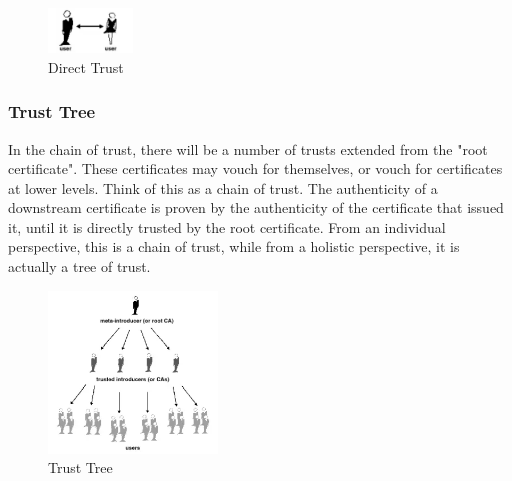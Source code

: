 \begin{figure}[H] %
    \centering %
    \includegraphics[width=0.2\textwidth]{figures/directTrust.png} %
    \caption{Direct Trust} %
    \label{Fig.3: Direct Trust} %
\end{figure}


\subsubsection{Trust Tree}
In the chain of trust, there will be a number of trusts extended from the "root 
certificate". These certificates may vouch for themselves, or vouch for certificates 
at lower levels. Think of this as a chain of trust\cite{b31}. The authenticity of a downstream 
certificate is proven by the authenticity of the certificate that issued it, until 
it is directly trusted by the root certificate. From an individual perspective, this 
is a chain of trust, while from a holistic perspective, it is actually a tree of trust\cite{b28}.

\begin{figure}[H] %
    \centering %
    \includegraphics[width=0.4\textwidth]{figures/trustTree.png} %
    \caption{Trust Tree} %
    \label{Fig.4: Trust Tree} %
\end{figure}


